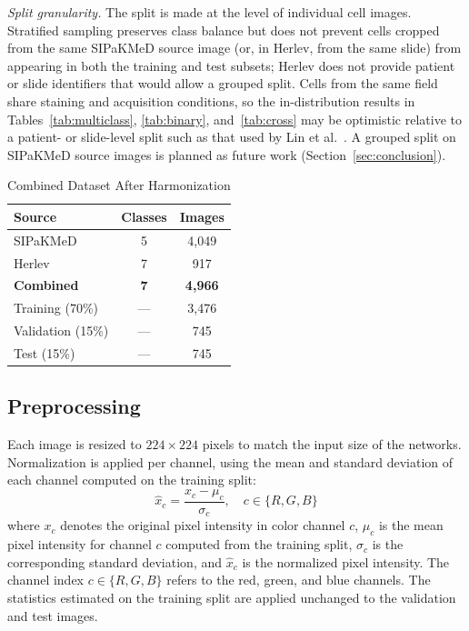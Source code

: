 \documentclass[conference]{IEEEtran}
\begin{document}
\textit{Split granularity.} The split is made at the level of individual cell images. Stratified sampling preserves class balance but does not prevent cells cropped from the same SIPaKMeD source image (or, in Herlev, from the same slide) from appearing in both the training and test subsets; Herlev does not provide patient or slide identifiers that would allow a grouped split. Cells from the same field share staining and acquisition conditions, so the in-distribution results in Tables~\ref{tab:multiclass}, \ref{tab:binary}, and~\ref{tab:cross} may be optimistic relative to a patient- or slide-level split such as that used by Lin et al.\ \cite{lin2019}. A grouped split on SIPaKMeD source images is planned as future work (Section~\ref{sec:conclusion}).

\begin{table}[t]
\caption{Combined Dataset After Harmonization}
\label{tab:dataset}
\centering
\begin{tabular}{lcc}
\toprule
\textbf{Source} & \textbf{Classes} & \textbf{Images}\\
\midrule
SIPaKMeD & 5 & 4,049\\
Herlev   & 7 & 917\\
\midrule
\textbf{Combined} & \textbf{7} & \textbf{4,966}\\
\quad Training (70\%) & --- & 3,476\\
\quad Validation (15\%) & --- & 745\\
\quad Test (15\%) & --- & 745\\
\bottomrule
\end{tabular}
\end{table}

\subsection{Preprocessing}
\label{sec:preproc}

Each image is resized to $224\times224$ pixels to match the input size of the networks. Normalization is applied per channel, using the mean and standard deviation of each channel computed on the training split:
\begin{equation}
    \hat{x}_c = \frac{x_c - \mu_c}{\sigma_c}, \quad c \in \{R,G,B\}
    \label{eq:norm}
\end{equation}
where $x_c$ denotes the original pixel intensity in color channel $c$, $\mu_c$ is the mean pixel intensity for channel $c$ computed from the training split, $\sigma_c$ is the corresponding standard deviation, and $\hat{x}_c$ is the normalized pixel intensity. The channel index $c\in\{R,G,B\}$ refers to the red, green, and blue channels. The statistics estimated on the training split are applied unchanged to the validation and test images.
\end{document}
